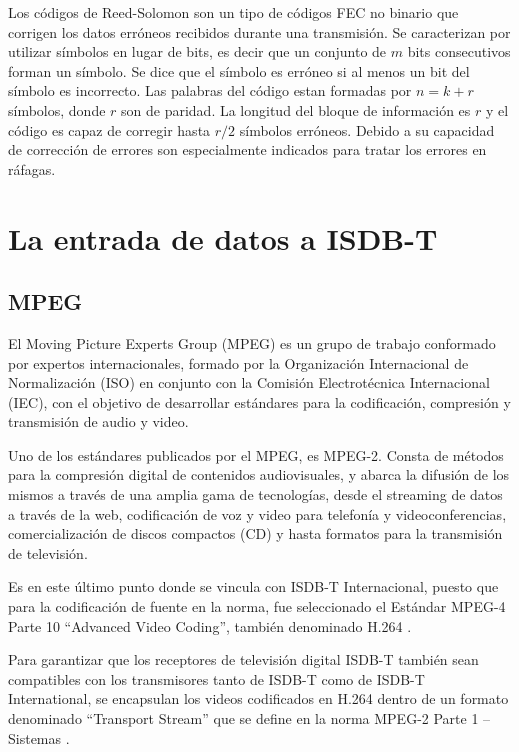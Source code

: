 Los códigos de Reed-Solomon son un tipo de códigos FEC no binario que corrigen los datos erróneos recibidos durante una transmisión. Se caracterizan por utilizar símbolos en lugar de bits, es decir que un conjunto de $m$ bits consecutivos forman un símbolo. Se dice que el símbolo es erróneo si al menos un bit del símbolo es incorrecto. Las palabras del código estan formadas por $n = k +r $ símbolos, donde $r$ son de paridad. La longitud del bloque de información es $r$ y el código es capaz de corregir hasta $r/2$ símbolos erróneos. 
Debido a su capacidad de corrección de errores son especialmente indicados para tratar los errores en ráfagas.



\section{La entrada de datos a ISDB-T}

\subsection{MPEG}

El Moving Picture Experts Group (MPEG)\cite{MPEG} es un grupo de trabajo conformado por expertos internacionales, formado por la Organización Internacional de Normalización (ISO) en conjunto con la Comisión Electrotécnica Internacional (IEC), con el objetivo de desarrollar estándares para la codificación, compresión y transmisión de audio y video.

Uno de los estándares publicados por el MPEG, es MPEG-2. Consta de métodos para la compresión digital de contenidos audiovisuales,  y abarca la difusión de los mismos a través de una amplia gama de tecnologías, desde el streaming de datos a través de la web, codificación de voz y video para telefonía y videoconferencias, comercialización de discos compactos (\gls{CD}) y hasta formatos para la transmisión de televisión. 

Es en este último punto donde se vincula con ISDB-T Internacional, puesto que para la codificación de fuente en la norma, fue seleccionado el Estándar MPEG-4 Parte 10 “Advanced Video Coding”, también denominado H.264 \cite{mpeg4_10}.

Para garantizar que los receptores de televisión digital ISDB-T también sean compatibles con los transmisores tanto de ISDB-T como de ISDB-T International, se encapsulan los videos codificados en H.264 dentro de un formato denominado “Transport Stream” que se define en la norma MPEG-2 Parte 1 – Sistemas \cite{mpeg2_1}.

